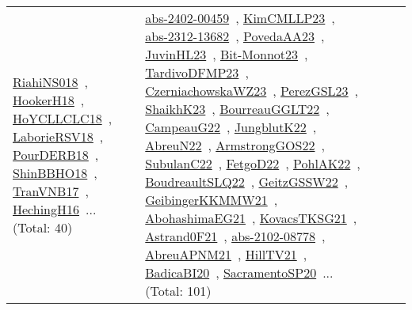 {\begin{longtable}{lp{3cm}>{\raggedright\arraybackslash}p{6cm}>{\raggedright\arraybackslash}p{6cm}>{\raggedright\arraybackslash}p{8cm}}
\href{works/RiahiNS018.pdf}{RiahiNS018}~\cite{RiahiNS018}, \href{works/HookerH18.pdf}{HookerH18}~\cite{HookerH18}, \href{works/HoYCLLCLC18.pdf}{HoYCLLCLC18}~\cite{HoYCLLCLC18}, \href{works/LaborieRSV18.pdf}{LaborieRSV18}~\cite{LaborieRSV18}, \href{works/PourDERB18.pdf}{PourDERB18}~\cite{PourDERB18}, \href{works/ShinBBHO18.pdf}{ShinBBHO18}~\cite{ShinBBHO18}, \href{works/TranVNB17.pdf}{TranVNB17}~\cite{TranVNB17}, \href{works/HechingH16.pdf}{HechingH16}~\cite{HechingH16}... (Total: 40) & \href{works/abs-2402-00459.pdf}{abs-2402-00459}~\cite{abs-2402-00459}, \href{works/KimCMLLP23.pdf}{KimCMLLP23}~\cite{KimCMLLP23}, \href{works/abs-2312-13682.pdf}{abs-2312-13682}~\cite{abs-2312-13682}, \href{works/PovedaAA23.pdf}{PovedaAA23}~\cite{PovedaAA23}, \href{works/JuvinHL23.pdf}{JuvinHL23}~\cite{JuvinHL23}, \href{works/Bit-Monnot23.pdf}{Bit-Monnot23}~\cite{Bit-Monnot23}, \href{works/TardivoDFMP23.pdf}{TardivoDFMP23}~\cite{TardivoDFMP23}, \href{works/CzerniachowskaWZ23.pdf}{CzerniachowskaWZ23}~\cite{CzerniachowskaWZ23}, \href{works/PerezGSL23.pdf}{PerezGSL23}~\cite{PerezGSL23}, \href{works/ShaikhK23.pdf}{ShaikhK23}~\cite{ShaikhK23}, \href{works/BourreauGGLT22.pdf}{BourreauGGLT22}~\cite{BourreauGGLT22}, \href{works/CampeauG22.pdf}{CampeauG22}~\cite{CampeauG22}, \href{works/JungblutK22.pdf}{JungblutK22}~\cite{JungblutK22}, \href{works/AbreuN22.pdf}{AbreuN22}~\cite{AbreuN22}, \href{works/ArmstrongGOS22.pdf}{ArmstrongGOS22}~\cite{ArmstrongGOS22}, \href{works/SubulanC22.pdf}{SubulanC22}~\cite{SubulanC22}, \href{works/FetgoD22.pdf}{FetgoD22}~\cite{FetgoD22}, \href{works/PohlAK22.pdf}{PohlAK22}~\cite{PohlAK22}, \href{works/BoudreaultSLQ22.pdf}{BoudreaultSLQ22}~\cite{BoudreaultSLQ22}, \href{works/GeitzGSSW22.pdf}{GeitzGSSW22}~\cite{GeitzGSSW22}, \href{works/GeibingerKKMMW21.pdf}{GeibingerKKMMW21}~\cite{GeibingerKKMMW21}, \href{works/AbohashimaEG21.pdf}{AbohashimaEG21}~\cite{AbohashimaEG21}, \href{works/KovacsTKSG21.pdf}{KovacsTKSG21}~\cite{KovacsTKSG21}, \href{works/Astrand0F21.pdf}{Astrand0F21}~\cite{Astrand0F21}, \href{works/abs-2102-08778.pdf}{abs-2102-08778}~\cite{abs-2102-08778}, \href{works/AbreuAPNM21.pdf}{AbreuAPNM21}~\cite{AbreuAPNM21}, \href{works/HillTV21.pdf}{HillTV21}~\cite{HillTV21}, \href{works/BadicaBI20.pdf}{BadicaBI20}~\cite{BadicaBI20}, \href{works/SacramentoSP20.pdf}{SacramentoSP20}~\cite{SacramentoSP20}... (Total: 101)\\

\end{longtable}}
